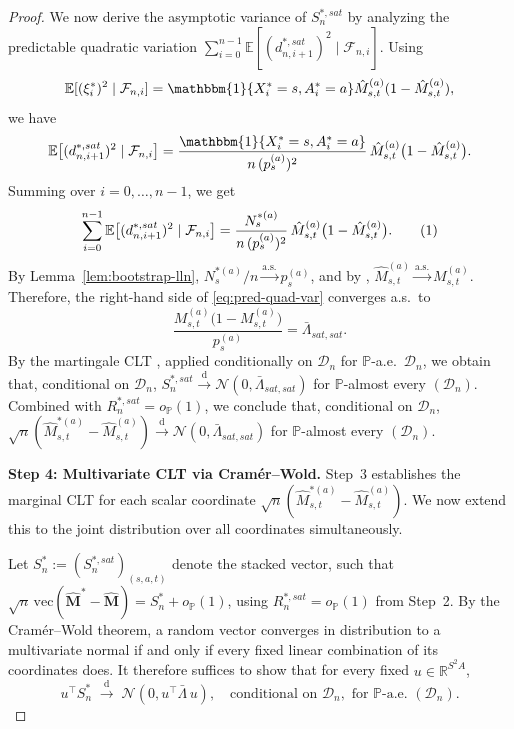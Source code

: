 \documentclass{article}
\numberwithin{equation}{section}
\newcommand\numberthis{\addtocounter{equation}{1}\tag{\theequation}}
\newcommand{\indicator}{\mathbbm{1}}
\begin{document}
\begin{proof}
We now derive the asymptotic variance of $S_n^{\ast,sat}$ by analyzing the predictable quadratic variation $\sum_{i=0}^{n-1}\mathbb{E}[(d_{n,i+1}^{\ast,sat})^2\mid\mathcal{F}_{n,i}]$.
Using 
\[
\mathbb{E}[(\xi_i^\ast)^2\mid\mathcal{F}_{n,i}]=\indicator\{X_i^\ast=s,A_i^\ast=a\}\hat M_{s,t}^{(a)}(1-\hat M_{s,t}^{(a)}),
\]
we have
\[
\mathbb{E}\bigl[(d_{n,i+1}^{\ast,sat})^2\mid\mathcal{F}_{n,i}\bigr]
= \frac{\indicator\{X_i^\ast=s,A_i^\ast=a\}}{n\,(p_s^{(a)})^2}\,\hat M_{s,t}^{(a)}\bigl(1-\hat M_{s,t}^{(a)}\bigr).
\]
Summing over $i=0,\ldots,n-1$, we get
\begin{align*}
\sum_{i=0}^{n-1}\mathbb{E}\bigl[(d_{n,i+1}^{\ast,sat})^2\mid\mathcal{F}_{n,i}\bigr]
=\frac{N_s^{\ast(a)}}{n\,(p_s^{(a)})^2}\,\hat M_{s,t}^{(a)}\bigl(1-\hat M_{s,t}^{(a)}\bigr).
\numberthis\label{eq:pred-quad-var}
\end{align*}
By Lemma~\ref{lem:bootstrap-lln}, $N_s^{\ast(a)}/n\xrightarrow{\mathrm{a.s.}}p_s^{(a)}$, and by \citet[Lemma~2]{su2025centrallimittheoremstransition}, $\hat M_{s,t}^{(a)}\xrightarrow{\mathrm{a.s.}} M_{s,t}^{(a)}$.
Therefore, the right-hand side of \eqref{eq:pred-quad-var} converges a.s.\ to
\[
\frac{M_{s,t}^{(a)}\bigl(1-M_{s,t}^{(a)}\bigr)}{p_s^{(a)}}=\bar\Lambda_{sat,sat}.
\]
By the martingale CLT \citep[Corollary~3.1]{hall1980martingale}, applied conditionally on $\mathcal{D}_n$ for $\mathbb{P}$-a.e.\ $\mathcal{D}_n$, we obtain that, conditional on $\mathcal{D}_n$, $S_n^{\ast,sat}\xrightarrow{\mathrm{d}}\mathcal{N}(0,\bar\Lambda_{sat,sat})$ for $\mathbb{P}$-almost every $(\mathcal{D}_n)$. Combined with $R_n^{\ast,sat}=o_{\mathbb{P}}(1)$, we conclude that, conditional on $\mathcal{D}_n$, $\sqrt{n}(\hat M_{s,t}^{\ast(a)}-\hat M_{s,t}^{(a)})\xrightarrow{\mathrm{d}}\mathcal{N}(0,\bar\Lambda_{sat,sat})$ for $\mathbb{P}$-almost every $(\mathcal{D}_n)$.

\medskip\noindent\textbf{Step 4: Multivariate CLT via Cram\'{e}r--Wold.}
Step~3 establishes the marginal CLT for each scalar coordinate $\sqrt{n}(\hat M_{s,t}^{\ast(a)}-\hat M_{s,t}^{(a)})$. We now extend this to the joint distribution over all coordinates simultaneously. 

Let $S_n^\ast:=(S_n^{\ast,sat})_{(s,a,t)}$ denote the stacked vector, such that $\sqrt{n}\,\mathrm{vec}(\hat{\mathbf{M}}^\ast-\hat{\mathbf{M}})=S_n^\ast+o_{\mathbb{P}}(1)$, using $R_n^{\ast,sat}=o_{\mathbb{P}}(1)$ from Step~2. By the Cram\'{e}r--Wold theorem, a random vector converges in distribution to a multivariate normal if and only if every fixed linear combination of its coordinates does. It therefore suffices to show that for every fixed $u\in\mathbb{R}^{S^2A}$,
\[
u^\top S_n^\ast \;\xrightarrow{\mathrm{d}}\; \mathcal{N}(0,u^\top\bar\Lambda\, u), \quad \text{conditional on } \mathcal{D}_n, \text{ for } \mathbb{P}\text{-a.e.\ } (\mathcal{D}_n).
\]


\end{proof}
\end{document}
